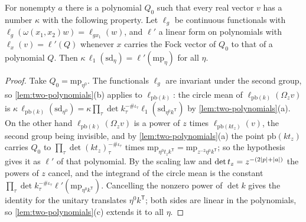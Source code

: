\begin{lemma}\label{lem:archimedean-step}
For nonempty $a$ there is a polynomial $Q_0$ such that every real vector $v$ has a number $\kappa$ with the following property. Let $\ell_g$ be continuous functionals with
$\ell_g(\omega(x_1,x_2)w)=\ell_{gx_1}(w)$, and $\ell'$ a linear form on polynomials with $\ell_x(v)=\ell'(Q)$ whenever $x$ carries the Fock vector of $Q_0$ to that of a polynomial $Q$. Then
$\kappa\,\ell_1(\mathrm{sd}_\eta)=\ell'(\mathrm{mp}_\eta)$ for all $\eta$.
\end{lemma}

\begin{proof}
Take $Q_0=\mathrm{mp}_{\eta^0}$. The functionals $\ell_g$ are invariant under the second group, so \cref{lem:two-polynomials}(b) applies to $\ell_{\mathrm{pb}(k)}$: the circle mean of $\ell_{\mathrm{pb}(k)}(\Omega_zv)$ is
$\kappa\,\ell_{\mathrm{pb}(k)}(\mathrm{sd}_{\eta^0})=\kappa\prod_\tau\det k_\tau^{-\#\iota_\tau}\ell_1(\mathrm{sd}_{\eta^0k^{\mathsf T}})$ by \cref{lem:two-polynomials}(a). On the other hand $\ell_{\mathrm{pb}(k)}(\Omega_zv)$ is a power of $z$ times
$\ell_{\mathrm{pb}(kt_z)}(v)$, the second group being invisible, and by \cref{lem:two-polynomials}(a) the point $\mathrm{pb}(kt_z)$ carries $Q_0$ to $\prod_\tau\det(kt_z)_\tau^{-\#\iota_\tau}$ times
$\mathrm{mp}_{\eta^0t_zk^{\mathsf T}}=\mathrm{mp}_{z^{-2}\eta^0k^{\mathsf T}}$; so the hypothesis gives it as $\ell'$ of that polynomial. By the scaling law and $\det t_z=z^{-(2\lvert p\rvert+\lvert a\rvert)}$ the powers of $z$ cancel, and the integrand of
the circle mean is the constant $\prod_\tau\det k_\tau^{-\#\iota_\tau}\ell'(\mathrm{mp}_{\eta^0k^{\mathsf T}})$. Cancelling the nonzero power of $\det k$ gives the identity for the unitary translates $\eta^0k^{\mathsf T}$; both sides are linear in the polynomials, so \cref{lem:two-polynomials}(c) extends it to
all $\eta$.
\end{proof}

